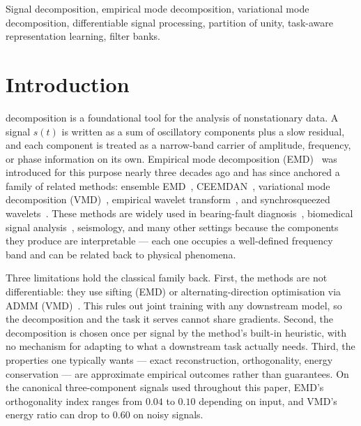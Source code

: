 \documentclass[journal]{IEEEtran}
\theoremstyle{remark}
\begin{document}
\begin{IEEEkeywords}
Signal decomposition, empirical mode decomposition, variational mode
decomposition, differentiable signal processing, partition of unity,
task-aware representation learning, filter banks.
\end{IEEEkeywords}

\section{Introduction}
\label{sec:intro}

 decomposition is a foundational tool for the
analysis of nonstationary data. A signal $s(t)$ is written as a sum of
oscillatory components plus a slow residual, and each component is
treated as a narrow-band carrier of amplitude, frequency, or phase
information on its own. Empirical mode decomposition
(EMD)~\cite{huang1998emd} was introduced for this purpose nearly three
decades ago and has since anchored a family of related methods:
ensemble EMD~\cite{wu2009eemd}, CEEMDAN~\cite{torres2011ceemdan},
variational mode decomposition (VMD)~\cite{dragomiretskiy2014vmd},
empirical wavelet transform~\cite{gilles2013ewt}, and synchrosqueezed
wavelets~\cite{daubechies2011synchrosqueezing}. These methods are
widely used in bearing-fault diagnosis~\cite{lei2013bearingfault},
biomedical signal analysis~\cite{pachori2017eeg}, seismology, and
many other settings because the components they produce are
interpretable --- each one occupies a well-defined frequency band and
can be related back to physical phenomena.

Three limitations hold the classical family back. First, the methods
are not differentiable: they use sifting (EMD) or alternating-direction
optimisation via ADMM (VMD)~\cite{boyd2011admm}. This rules out joint
training with any downstream model, so the decomposition and the
task it serves cannot share gradients. Second, the decomposition is
chosen once per signal by the method's built-in heuristic, with no
mechanism for adapting to what a downstream task actually needs.
Third, the properties one typically wants --- exact reconstruction,
orthogonality, energy conservation --- are approximate empirical
outcomes rather than guarantees. On the canonical three-component
signals used throughout this paper, EMD's orthogonality index ranges
from $0.04$ to $0.10$ depending on input, and VMD's energy ratio can
drop to $0.60$ on noisy signals.
\end{document}
